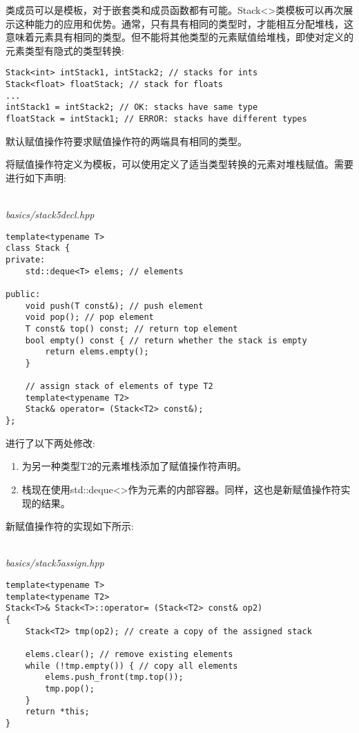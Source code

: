 
类成员可以是模板，对于嵌套类和成员函数都有可能。Stack<>类模板可以再次展示这种能力的应用和优势。通常，只有具有相同的类型时，才能相互分配堆栈，这意味着元素具有相同的类型。但不能将其他类型的元素赋值给堆栈，即使对定义的元素类型有隐式的类型转换:

\begin{lstlisting}[style=styleCXX]
Stack<int> intStack1, intStack2; // stacks for ints
Stack<float> floatStack; // stack for floats
...
intStack1 = intStack2; // OK: stacks have same type
floatStack = intStack1; // ERROR: stacks have different types
\end{lstlisting}

默认赋值操作符要求赋值操作符的两端具有相同的类型。

将赋值操作符定义为模板，可以使用定义了适当类型转换的元素对堆栈赋值。需要进行如下声明:

\hspace*{\fill} \\ %
\noindent
\textit{basics/stack5decl.hpp}
\begin{lstlisting}[style=styleCXX]
template<typename T>
class Stack {
private:
	std::deque<T> elems; // elements
	
public:
	void push(T const&); // push element
	void pop(); // pop element
	T const& top() const; // return top element
	bool empty() const { // return whether the stack is empty
		return elems.empty();
	}
	
	// assign stack of elements of type T2
	template<typename T2>
	Stack& operator= (Stack<T2> const&);
};
\end{lstlisting}

进行了以下两处修改:

\begin{enumerate}
\item 
为另一种类型T2的元素堆栈添加了赋值操作符声明。

\item 
栈现在使用std::deque<>作为元素的内部容器。同样，这也是新赋值操作符实现的结果。
\end{enumerate}

新赋值操作符的实现如下所示:

\hspace*{\fill} \\ %
\noindent
\textit{basics/stack5assign.hpp}
\begin{lstlisting}[style=styleCXX]
template<typename T>
template<typename T2>
Stack<T>& Stack<T>::operator= (Stack<T2> const& op2)
{
	Stack<T2> tmp(op2); // create a copy of the assigned stack
	
	elems.clear(); // remove existing elements
	while (!tmp.empty()) { // copy all elements
		elems.push_front(tmp.top());
		tmp.pop();
	}
	return *this;
}
\end{lstlisting}

